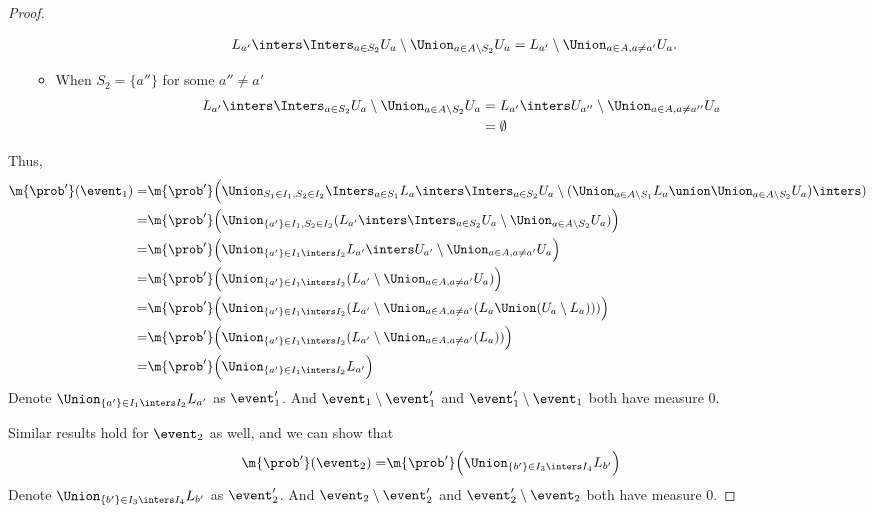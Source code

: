 \begin{proof}
\begin{itemize}
\begin{itemize}
\begin{align*}
        L_{a'} \inters \Inters_{a \in S_2} U_a \setminus \Union_{a \in A \setminus S_2} U_a
        &= L_{a'} \setminus \Union_{a \in A, a \neq a'} U_a .
      \end{align*}
        \item
      When $S_2 = \{a''\}$ for some $a'' \neq a'$
      \begin{align*}
        L_{a'} \inters \Inters_{a \in S_2} U_a \setminus \Union_{a \in A \setminus S_2} U_a
        &= L_{a'} \inters U_{a''} \setminus \Union_{a \in A, a \neq a''} U_a \\
        &= \emptyset
      \end{align*}
      \end{itemize}
      \end{itemize}

Thus,
      \begin{align*}
         \m{\prob'}(\event_1)
        = & \m{\prob'}\Big(\Union_{S_1 \in I_1, S_2 \in I_2} \Inters_{a \in S_1} L_a \inters \Inters_{a \in S_2} U_a \setminus (\Union_{a \in A \setminus S_1} L_a \union \Union_{a \in A \setminus S_2} U_a) \inters) \\
          = & \m{\prob'}\Big(\Union_{\{a'\} \in I_1, S_2 \in I_2} ( L_{a'} \inters \Inters_{a \in S_2} U_a \setminus \Union_{a \in A \setminus S_2} U_a) \Big) \\
          = & \m{\prob'}\Big(\Union_{\{a'\} \in I_1 \inters I_2} L_{a'} \inters U_{a'} \setminus \Union_{a \in A, a \neq a'} U_a \Big)  \\
          = & \m{\prob'}\Big(\Union_{\{a'\} \in I_1 \inters I_2} ( L_{a'} \setminus \Union_{a \in A, a \neq a'} U_a )  \Big) \\
          = & \m{\prob'}\Big(\Union_{\{a'\} \in I_1 \inters I_2} ( L_{a'} \setminus \Union_{a \in A, a \neq a'} (L_a \Union (U_a \setminus L_a)) )  \Big) \\
          = & \m{\prob'}\Big(\Union_{\{a'\} \in I_1 \inters I_2} ( L_{a'} \setminus \Union_{a \in A, a \neq a'} (L_a ) ) \Big) \\
          = & \m{\prob'}\Big(\Union_{\{a'\} \in I_1 \inters I_2} L_{a'} \Big)
      \end{align*}
      Denote $\Union_{\{a'\} \in I_1 \inters I_2} L_{a'}$
      as $\event'_1$.
      And $\event_1 \setminus \event'_1$ and $\event'_1 \setminus \event_1$ both have measure 0.

      Similar results hold for $\event_2$ as well, and we can show that
      \begin{align*}
        \m{\prob'}(\event_2)
         = & \m{\prob'}\Big(\Union_{\{b'\} \in I_3 \inters I_4} L_{b'} \Big)
      \end{align*}
      Denote $\Union_{\{b'\} \in I_3 \inters I_4} L_{b'}$
      as $\event'_2$.
      And $\event_2 \setminus \event'_2$ and $\event'_2 \setminus \event_2$ both have measure 0.



\end{proof}
